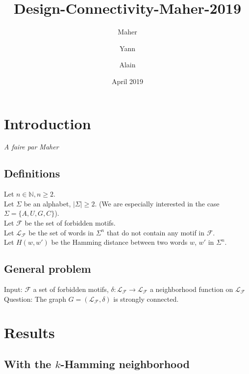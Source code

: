 \documentclass{article}
\title{Design-Connectivity-Maher-2019}
\author{Maher \and Yann \and Alain}
\date{April 2019}
\begin{document}
\maketitle

\newtheorem{theorem}{Theorem}
\newtheorem{result}[theorem]{Result}
\newtheorem{corollary}[theorem]{Corollary}

\newcommand{\Nat}{\mathbb{N}}
\newcommand{\PosInt}{\mathbb{N}^*}
\newcommand{\Forb}{\mathcal{F}}
\newcommand{\Lang}[1]{\mathcal{L}_{#1}}
\newcommand{\Hamming}[2]{H(#1,#2)}



\section{Introduction}
{\it A faire par Maher}

\subsection*{Definitions}

Let $n \in \Nat, n \geq 2$. \\
Let $\Sigma$ be an alphabet, $|\Sigma| \geq 2$. (We are especially interested in the case $\Sigma = \{A, U, G, C\}$). \\
Let $\Forb$ be the set of forbidden motifs. \\
Let $\Lang{\Forb}$ be the set of words in $\Sigma^n$ that do not contain any motif in $\Forb$. \\
Let $H(w,w')$ be the Hamming distance between two words $w$, $w'$ in $\Sigma^n$.

\subsection*{General problem}

Input: $\Forb$ a set of forbidden motifs, $\delta: \Lang{\Forb} \rightarrow \Lang{\Forb}$ a neighborhood function on $\Lang{\Forb}$ \\
Question: The graph $G = (\Lang{\Forb}, \delta)$ is strongly connected.

\section{Results}
\subsection{With the $k$-Hamming neighborhood}
\end{document}
